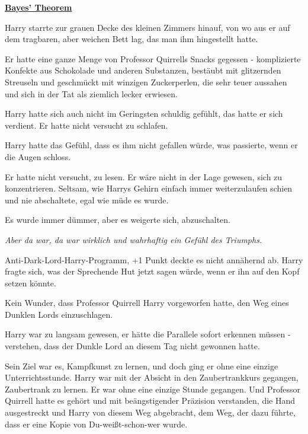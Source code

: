 

\hypertarget{bayes-theorem}{%

\textbf{\uline{Bayes' Theorem}}

Harry starrte zur grauen Decke des kleinen Zimmers hinauf, von wo aus er auf dem tragbaren, aber weichen Bett lag, das man ihm hingestellt hatte.

Er hatte eine ganze Menge von Professor Quirrells Snacks gegessen - komplizierte Konfekte aus Schokolade und anderen Substanzen, bestäubt mit glitzernden Streuseln und geschmückt mit winzigen Zuckerperlen, die sehr teuer aussahen und sich in der Tat als ziemlich lecker erwiesen.

Harry hatte sich auch nicht im Geringsten schuldig gefühlt, das hatte er sich verdient. Er hatte nicht versucht zu schlafen.

Harry hatte das Gefühl, dass es ihm nicht gefallen würde, was passierte, wenn er die Augen schloss.

Er hatte nicht versucht, zu lesen. Er wäre nicht in der Lage gewesen, sich zu konzentrieren. Seltsam, wie Harrys Gehirn einfach immer weiterzulaufen schien und nie abschaltete, egal wie müde es wurde.

Es wurde immer dümmer, aber es weigerte sich, abzuschalten.

\emph{Aber da war, da war wirklich und wahrhaftig ein Gefühl des Triumphs.}

Anti-Dark-Lord-Harry-Programm, +1 Punkt deckte es nicht annähernd ab. Harry fragte sich, was der Sprechende Hut jetzt sagen würde, wenn er ihn auf den Kopf setzen könnte.

Kein Wunder, dass Professor Quirrell Harry vorgeworfen hatte, den Weg eines Dunklen Lords einzuschlagen.

Harry war zu langsam gewesen, er hätte die Parallele sofort erkennen müssen - verstehen, dass der Dunkle Lord an diesem Tag nicht gewonnen hatte.

Sein Ziel war es, Kampfkunst zu lernen, und doch ging er ohne eine einzige Unterrichtsstunde. Harry war mit der Absicht in den Zaubertrankkurs gegangen, Zaubertrank zu lernen. Er war ohne eine einzige Stunde gegangen. Und Professor Quirrell hatte es gehört und mit beängstigender Präzision verstanden, die Hand ausgestreckt und Harry von diesem Weg abgebracht, dem Weg, der dazu führte, dass er eine Kopie von Du-weißt-schon-wer wurde.

}
